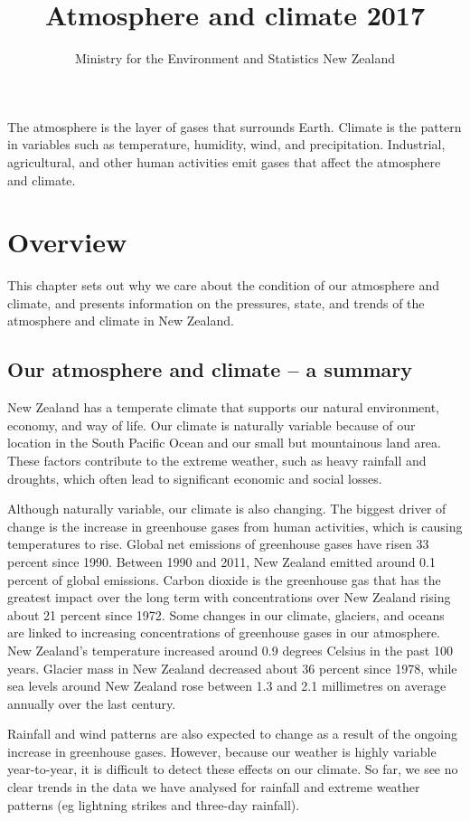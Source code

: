 \documentclass[11pt]{article} %
\title{Atmosphere and climate 2017}
\author{Ministry for the Environment and Statistics New Zealand}
\begin{document}
\maketitle
The atmosphere is the layer of gases that surrounds Earth. Climate is the pattern in variables such as temperature, humidity, wind, and precipitation. Industrial, agricultural, and other human activities emit gases that affect the atmosphere and climate.

\section{Overview}
This chapter sets out why we care about the condition of our atmosphere and climate, and presents information on the pressures, state, and trends of the atmosphere and climate in New Zealand.

\subsection{Our atmosphere and climate – a summary}
New Zealand has a temperate climate that supports our natural environment, economy, and way of life. Our climate is naturally variable because of our location in the South Pacific Ocean and our small but mountainous land area. These factors contribute to the extreme weather, such as heavy rainfall and droughts, which often lead to significant economic and social losses.

Although naturally variable, our climate is also changing. The biggest driver of change is the increase in greenhouse gases from human activities, which is causing temperatures to rise. Global net emissions of greenhouse gases have risen 33 percent since 1990. Between 1990 and 2011, New Zealand emitted around 0.1 percent of global emissions. Carbon dioxide is the greenhouse gas that has the greatest impact over the long term with concentrations over New Zealand rising about 21 percent since 1972. Some changes in our climate, glaciers, and oceans are linked to increasing concentrations of greenhouse gases in our atmosphere. New Zealand’s temperature increased around 0.9 degrees Celsius in the past 100 years. Glacier mass in New Zealand decreased about 36 percent since 1978, while sea levels around New Zealand rose between 1.3 and 2.1 millimetres on average annually over the last century.

Rainfall and wind patterns are also expected to change as a result of the ongoing increase in greenhouse gases. However, because our weather is highly variable year-to-year, it is difficult to detect these effects on our climate. So far, we see no clear trends in the data we have analysed for rainfall and extreme weather patterns (eg lightning strikes and three-day rainfall).
\end{document}
